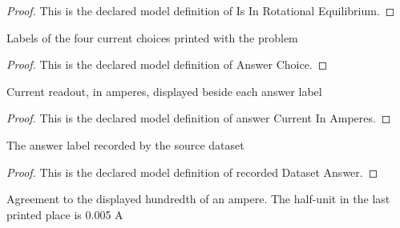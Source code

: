\begin{proof}
  This is the declared model definition of Is In Rotational Equilibrium.
\end{proof}
\begin{definition}
  \label{def:physics:phyx-mini-0951:phyxminiproblems-problemphyxmini0951-answerchoice}
  Labels of the four current choices printed with the problem
\end{definition}
\begin{proof}
  This is the declared model definition of Answer Choice.
\end{proof}
\begin{definition}
  \label{def:physics:phyx-mini-0951:phyxminiproblems-problemphyxmini0951-answercurrentinamperes}
  Current readout, in amperes, displayed beside each answer label
\end{definition}
\begin{proof}
  This is the declared model definition of answer Current In Amperes.
\end{proof}
\begin{definition}
  \label{def:physics:phyx-mini-0951:phyxminiproblems-problemphyxmini0951-recordeddatasetanswer}
  The answer label recorded by the source dataset
\end{definition}
\begin{proof}
  This is the declared model definition of recorded Dataset Answer.
\end{proof}
\begin{definition}
  \label{def:physics:phyx-mini-0951:phyxminiproblems-problemphyxmini0951-answermatchescurrenttodisplayedprecision}
  Agreement to the displayed hundredth of an ampere. The half-unit in the last printed place is 0.005 A
\end{definition}
